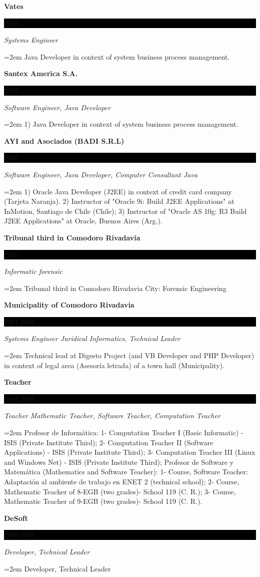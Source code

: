 \documentclass[paper=a4,fontsize=11pt]{scrartcl} %
\newcommand{\sepspace}{\vspace*{1em}}		%
\newcommand{\EducationEntry}[4]{
		\noindent \textbf{#1} \hfill      %
		\colorbox{Black}{%
			\parbox{6em}{%
			\hfill\color{White}#2}} \par  %
		\noindent \textit{#3} \par        %
		\noindent\hangindent=2em\hangafter=0 \small #4 %
		\normalsize \par}
\begin{document}
\EducationEntry{Vates}{2008}{Systems Engineer}
{Java Developer in context of system business process management.}
\sepspace

\EducationEntry{Santex America S.A.}{2007}{Software Engineer, Java Developer}
{1) Java Developer in context of system business process management.}
\sepspace

\EducationEntry{AYI and Asociados (BADI S.R.L)}{2007}{Software Engineer, Java Developer, Computer Consultant Java}
{1) Oracle Java Developer (J2EE) in context of credit card company (Tarjeta Naranja).
2) Instructor of "Oracle 9i: Build J2EE Applications" at InMotion, Santiago de Chile (Chile);
3) Instructor of "Oracle AS 10g: R3 Build J2EE Applications" at Oracle, Buenos Aires (Arg.).}
\sepspace

\EducationEntry{Tribunal third in Comodoro Rivadavia}{2006}{Informatic forensic}{
Tribunal third in Comodoro Rivadavia City: Forensic Engineering}
\sepspace

\EducationEntry{Municipality of Comodoro Rivadavia}{2004-2006}{Systems Engineer Juridical Informatics, Technical Leader}
{Technical lead at Digesto Project (and VB Developer and PHP Developer) in context of legal area (Asesoría letrada) of a town hall (Municipality).}
\sepspace

\EducationEntry{Teacher}{2004-2005}{Teacher Mathematic Teacher, Software Teacher, Computation Teacher}
{Profesor de Informática: 1- Computation Teacher I (Basic Informatic) - ISIS (Private Institute Third); 2- Computation Teacher II (Software Applications) - ISIS (Private Institute Third); 3- Computation Teacher III (Linux and Windows Net) - ISIS (Private Institute Third); Profesor de Software y Matemática (Mathematics and Software Teacher): 1- Course, Software Teacher: Adaptación al ambiente de trabajo en ENET 2 (technical school); 2- Course, Mathematic Teacher of 8-EGB  (two grades)- School 119 (C. R.); 3- Course, Mathematic Teacher of 9-EGB (two grades)- School 119 (C. R.).
}
\sepspace

\EducationEntry{DeSoft}{2000-2003}{Developer, Technical Leader}{
Developer, Technical Leader}
\sepspace
\end{document}

